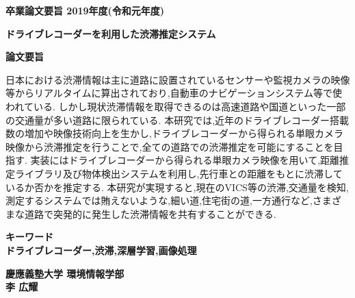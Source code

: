 \begin{center}
\textbf{\Large 卒業論文要旨 2019年度(令和元年度)}

\vspace{6.18mm}

\textbf{\Large ドライブレコーダーを利用した渋滞推定システム}
\end{center}

\vspace{10mm}

\begin{flushleft}
\textbf{論文要旨}\\
\end{flushleft}
日本における渋滞情報は主に道路に設置されているセンサーや監視カメラの映像等からリアルタイムに算出されており,自動車のナビゲーションシステム等で使われている.
しかし現状渋滞情報を取得できるのは高速道路や国道といった一部の交通量が多い道路に限られている.
本研究では,近年のドライブレコーダー搭載数の増加や映像技術向上を生かし,ドライブレコーダーから得られる単眼カメラ映像から渋滞推定を行うことで,全ての道路での渋滞推定を可能にすることを目指す.
実装にはドライブレコーダーから得られる単眼カメラ映像を用いて,距離推定ライブラリ及び物体検出システムを利用し,先行車との距離をもとに渋滞しているか否かを推定する.
本研究が実現すると,現在のVICS等の渋滞,交通量を検知,測定するシステムでは賄えないような,細い道,住宅街の道,一方通行など,さまざまな道路で突発的に発生した渋滞情報を共有することができる.


\begin{flushleft}
\textbf{キーワード}\\
\textbf{ドライブレコーダー,渋滞,深層学習,画像処理}

\end{flushleft}

\begin{flushright}
\textbf{慶應義塾大学 環境情報学部}\\
\textbf{李 広耀}
\end{flushright}
\newpage

